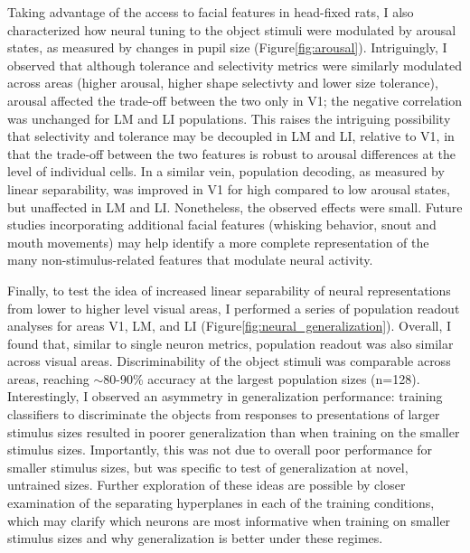 Taking advantage of the access to facial features in head-fixed rats, I also characterized how neural tuning to the object stimuli were modulated by arousal states, as measured by changes in pupil size (Figure\ref{fig:arousal}). Intriguingly, I observed that although tolerance and selectivity metrics were similarly modulated across areas (higher arousal, higher shape selectivty and lower size tolerance), arousal affected the trade-off between the two only in V1; the negative correlation was unchanged for LM and LI populations. This raises the intriguing possibility that selectivity and tolerance may be decoupled in LM and LI, relative to V1, in that the trade-off between the two features is robust to arousal differences at the level of individual cells. In a similar vein, population decoding, as measured by linear separability, was improved in V1 for high compared to low arousal states, but unaffected in LM and LI. Nonetheless, the observed effects were small. Future studies incorporating additional facial features (whisking behavior, snout and mouth movements) may help identify a more complete representation of the many non-stimulus-related features that modulate neural activity.

Finally, to test the idea of increased linear separability of neural representations from lower to higher level visual areas, I performed a series of population readout analyses for areas V1, LM, and LI (Figure\ref{fig:neural_generalization}). Overall, I found that, similar to single neuron metrics, population readout was also similar across visual areas. Discriminability of the object stimuli was comparable across areas, reaching $\sim$80-90\% accuracy at the largest population sizes (n=128). Interestingly, I observed an asymmetry in generalization performance:  training classifiers to discriminate the objects from responses to presentations of larger stimulus sizes resulted in poorer generalization than when training on the smaller stimulus sizes. Importantly, this was not due to overall poor performance for smaller stimulus sizes, but was specific to test of generalization at novel, untrained sizes. Further exploration of these ideas are possible by closer examination of the separating hyperplanes in each of the training conditions, which may clarify which neurons are most informative when training on smaller stimulus sizes and why generalization is better under these regimes. 

